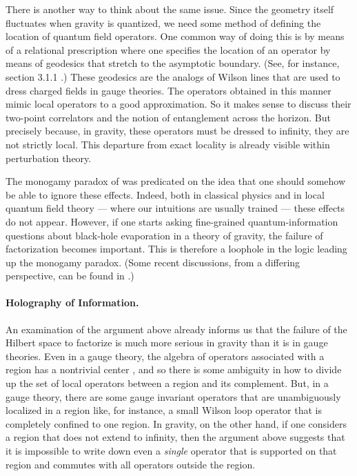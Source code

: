 \documentclass[12pt]{article}
\begin{document}
There is another way to think about the same issue. Since the geometry itself fluctuates when gravity is quantized, we need some method of defining the location of quantum field operators. One common way of doing this is by means of a relational prescription where one specifies the location of an operator by means of geodesics that stretch to the asymptotic boundary. (See, for instance, section 3.1.1 \cite{Papadodimas:2015jra}.) These geodesics are the analogs of Wilson lines that are used to dress charged fields in gauge theories.  The operators obtained in this manner mimic local operators to a good approximation. So it makes sense to discuss their two-point correlators and the notion of entanglement across the horizon. But precisely because, in gravity, these operators must be dressed to infinity, they are not strictly local. This departure from exact locality is already visible within perturbation theory.

The monogamy paradox of \cite{Mathur:2009hf,Almheiri:2012rt} was predicated on the idea that one
should somehow be able to ignore these effects. Indeed, both in classical physics and in local quantum field
theory  --- where our intuitions are usually trained --- these effects do not appear. However, if one
starts asking fine-grained quantum-information questions about black-hole evaporation in a theory of gravity, the failure of factorization becomes important. This is therefore a loophole in the logic leading up the monogamy paradox. (Some recent discussions, from a differing perspective, can be found in \cite{Karlsson:2020uga,Karlsson:2019vlf}.)


\paragraph{Holography of Information.}
An examination of the argument above already informs us that the failure of the Hilbert space to factorize is
 much more serious in gravity than it is in gauge theories. Even in a gauge theory, the algebra of operators
associated with a region has a nontrivial center \cite{Casini:2013rba,Casini:2014aia,Soni:2015yga,Ghosh:2015iwa}, and so there is some ambiguity in how to divide up the set of local operators between a region and its complement. But, in a gauge theory, there are some gauge invariant operators that are  unambiguously localized in a region like, for instance, a small Wilson loop operator that is completely confined
to one region. In gravity, on the other hand, if one considers a region that does not extend to infinity,
then the argument above suggests that it is impossible to write down even a {\em single} operator that is
supported on that region and commutes with all operators outside the region.
\end{document}
